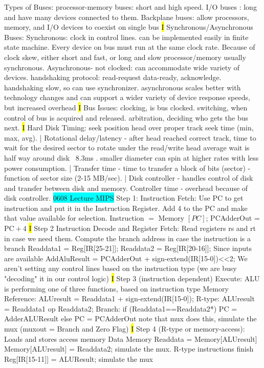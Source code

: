 \documentclass[fontsize=4pt]{scrartcl}
\begin{document}
Types of Buses: processor-memory buses: short and high speed. I/O buses : long and have many devices connected to them. Backplane buses: allow processors, memory, and I/O devices to coexist on single bus
\hl{I}
Synchronous/Asynchronous Buses: Synchronous: clock in control lines. can be implemented easily in finite state machine. Every device on bus must run at the same clock rate. Because of clock skew, either short and fast, or long and slow processor/memory usually synchronous. Asynchronous- not clocked: can accommodate wide variety of devices. handshaking protocol: read-request data-ready, acknowledge. handshaking slow, so can use synchronizer. asynchronous scales better with technology changes and can support a wider variety of device response speeds, but increased overhead
\hl{I} Bus Issues: clocking, is bus clocked. switching, when control of bus is acquired and released. arbitration, deciding who gets the bus next.
\hl{I} Hard Disk Timing: seek position head over proper track seek time (min, max, avg). | Rotational delay/latency - after head reached correct track, time to wait for the desired sector to rotate under the read/write head average wait is half way around disk ~8.3ms . smaller diameter can spin at higher rates with less power consumption. | Transfer time - time to transfer a block of bits (sector) - function of sector size (2-15 MB/sec). | Disk controller - handles control of disk and transfer between disk and memory. Controller time - overhead because of disk controller.
\colorbox{Cyan}{0608 Lecture MIPS} Step 1: Instruction Fetch: Use PC to get instruction and put it in the Instruction Register. Add 4 to the PC and make that value available for selection. Instruction $=$ Memory $[P C]$; PCAdderOut =$\mathrm{PC}+4$
\hl{I}
Step 2 Instruction Decode and Register Fetch: Read registers rs and rt in case we need them. Compute the branch address in case the instruction is a branch Readdata1 = Reg[IR[25-21]]; Readdata2 = Reg[IR[20-16]]; Since inputs are available AddAluResult = PCAdderOut + sign-extend(IR[15-0])<<2;	We aren't setting any control lines based on the instruction type (we are busy "decoding" it in our control logic)
\hl{I}
Step 3 (instruction dependent) Execute: ALU is performing one of three functions, based on instruction type Memory Reference: ALUresult = Readdata1 + sign-extend(IR[15-0]); R-type: ALUresult = Readdata1 op Readdata2; Branch: if (Readdata1==Readdata2*) PC = AdderALUResult else PC = PCAdderOut  note that mux does this, simulate the mux (muxout = Branch and Zero Flag)
\hl{I}
Step 4 (R-type or memory-access): Loads and stores access memory Data Memory Readdata = Memory[ALUresult] Memory[ALUresult] = Readdata2; simulate the mux. R-type instructions finish	Reg[IR[15-11]] = ALUResult;  simulate the mux
\end{document}
